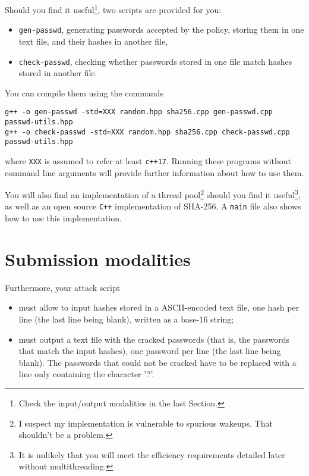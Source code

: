 \documentclass[a4paper,11pt]{article}
\begin{document}
Should you find it useful\footnote{Check the input/output modalities in the last Section.}, two scripts are provided for you:
\begin{itemize}
\item \texttt{gen-passwd}, generating passwords accepted by the policy, storing them in one text file, and their hashes in another file,
\item \texttt{check-passwd}, checking whether passwords stored in one file match hashes stored in another file.
\end{itemize}
You can compile them using the commands
\begin{lstlisting}
g++ -o gen-passwd -std=XXX random.hpp sha256.cpp gen-passwd.cpp passwd-utils.hpp
g++ -o check-passwd -std=XXX random.hpp sha256.cpp check-passwd.cpp passwd-utils.hpp
\end{lstlisting}
where \texttt{XXX} is assumed to refer at least \texttt{c++17}. Running these programs without command line arguments will provide further information about how to use them.

You will also find an implementation of a thread pool\footnote{I suspect my implementation is vulnerable to spurious wakeups. That shouldn't be a problem.} should you find it useful\footnote{It is unlikely that you will meet the efficiency requirements detailed later without multithreading.}, as well as an open source \texttt{C++} implementation of SHA-256. A \texttt{main} file also shows how to use this implementation.

\section*{Submission modalities}


Furthermore, your attack script
\begin{itemize}
\item must allow to input hashes stored in a ASCII-encoded text file, one hash per line (the last line being blank), written as a base-16 string;
\item must output a text file with the cracked passwords (that is, the passwords that match the input hashes), one password per line (the last line being blank). The passwords that could not be cracked have to be replaced with a line only containing the character '?'.
\end{itemize}
\end{document}
